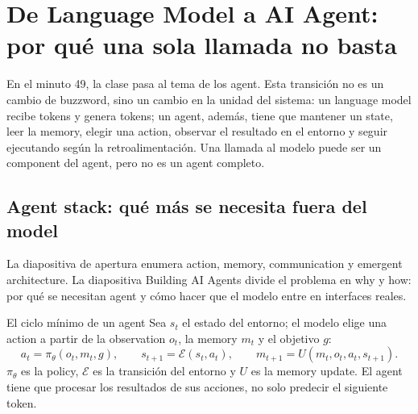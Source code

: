 \section{De Language Model a AI Agent: por qué una sola llamada no basta}

En el minuto 49, la clase pasa al tema de los agent. Esta transición no es un cambio de buzzword, sino un cambio en la unidad del sistema: un language model recibe tokens y genera tokens; un agent, además, tiene que mantener un state, leer la memory, elegir una action, observar el resultado en el entorno y seguir ejecutando según la retroalimentación. Una llamada al modelo puede ser un component del agent, pero no es un agent completo.

\subsection{Agent stack: qué más se necesita fuera del model}

La diapositiva de apertura enumera action, memory, communication y emergent architecture. La diapositiva Building AI Agents divide el problema en why y how: por qué se necesitan agent y cómo hacer que el modelo entre en interfaces reales.



\begin{importantbox}{El ciclo mínimo de un agent}
Sea $s_t$ el estado del entorno; el modelo elige una action a partir de la observation $o_t$, la memory $m_t$ y el objetivo $g$:
\[
a_t=\pi_\theta(o_t,m_t,g),\qquad
s_{t+1}=\mathcal{E}(s_t,a_t),\qquad
m_{t+1}=U(m_t,o_t,a_t,s_{t+1}).
\]
$\pi_\theta$ es la policy, $\mathcal{E}$ es la transición del entorno y $U$ es la memory update. El agent tiene que procesar los resultados de sus acciones, no solo predecir el siguiente token.
\end{importantbox}



